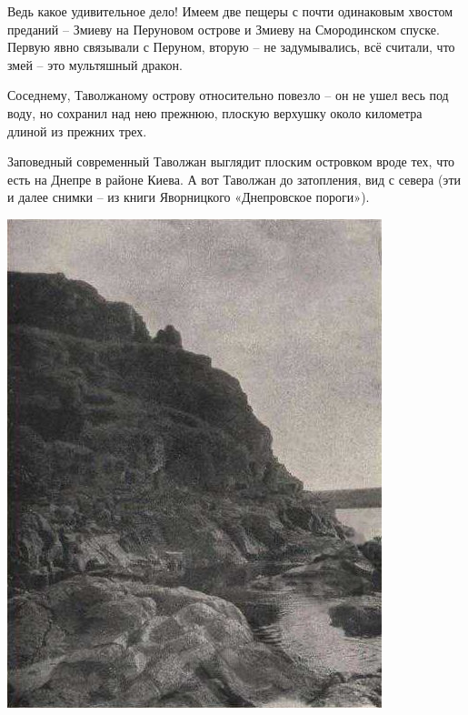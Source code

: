 Ведь какое удивительное дело! Имеем две пещеры с почти одинаковым хвостом преданий – Змиеву на Перуновом острове и Змиеву на Смородинском спуске. Первую явно связывали с Перуном, вторую – не задумывались, всё считали, что змей – это мультяшный дракон.

Соседнему, Таволжаному острову относительно повезло – он не ушел весь под воду, но сохранил над нею прежнюю, плоскую верхушку около километра длиной из прежних трех. %

Заповедный современный Таволжан выглядит плоским островком вроде тех, что есть на Днепре в районе Киева. А вот Таволжан до затопления, вид с севера (эти и далее снимки – из книги Яворницкого «Днепровское пороги»).

\newpage

\vspace*{\fill}
\begin{center}
\includegraphics[width=0.85\linewidth]{chast-zmiy/ktotakiezmei/tav01.jpg}
\end{center}
\vspace*{\fill}

